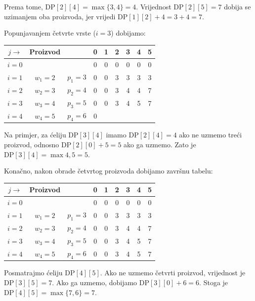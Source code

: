 Prema tome, $\textrm{DP}[2][4]=\max\{3,4\}=4.$ Vrijednost $\textrm{DP}[2][5]=7$ dobija se uzimanjem oba proizvoda, jer vrijedi $\textrm{DP}[1][2]+4 = 3+4 = 7.$

\medskip

Popunjavanjem četvrte vrste ($i=3$) dobijamo:

\begin{table}[H]
	\centering
	\begin{tabular}{|c|cc|cccccc|}\hline
		$j\rightarrow$ & Proizvod & & 0 & 1 & 2 & 3 & 4 & 5 \\ \hline
		$i=0$ & & & 0 & 0 & 0 & 0 & 0 & 0 \\
		$i=1$ & $w_1=2$ & $p_1=3$ & 0 & 0 & 3 & 3 & 3 & 3 \\
		$i=2$ & $w_2=3$ & $p_2=4$ & 0 & 0 & 3 & 4 & 4 & 7 \\
		$i=3$ & $w_3=4$ & $p_3=5$ & 0 & 0 & 3 & 4 & 5 & 7 \\
		$i=4$ & $w_4=5$ & $p_4=6$ & 0 & & & & & \\ \hline
	\end{tabular}
\end{table}

Na primjer, za ćeliju $\textrm{DP}[3][4]$ imamo $\textrm{DP}[2][4]=4$ ako ne uzmemo treći proizvod, odnosno $\textrm{DP}[2][0]+5=5$ ako ga uzmemo. Zato je $\textrm{DP}[3][4]=\max{4,5}=5.$

\medskip

Konačno, nakon obrade četvrtog proizvoda dobijamo završnu tabelu:

\begin{table}[H]
	\centering
	\begin{tabular}{|c|cc|cccccc|}\hline
		$j\rightarrow$ & Proizvod & & 0 & 1 & 2 & 3 & 4 & 5 \\ \hline
		$i=0$ & & & 0 & 0 & 0 & 0 & 0 & 0 \\
		$i=1$ & $w_1=2$ & $p_1=3$ & 0 & 0 & 3 & 3 & 3 & 3 \\
		$i=2$ & $w_2=3$ & $p_2=4$ & 0 & 0 & 3 & 4 & 4 & 7 \\
		$i=3$ & $w_3=4$ & $p_3=5$ & 0 & 0 & 3 & 4 & 5 & 7 \\
		$i=4$ & $w_4=5$ & $p_4=6$ & 0 & 0 & 3 & 4 & 5 & 7 \\ \hline
	\end{tabular}
\end{table}

Posmatrajmo ćeliju $\textrm{DP}[4][5]$. Ako ne uzmemo četvrti proizvod, vrijednost je $ \textrm{DP}[3][5]=7.$ Ako ga uzmemo, dobijamo $\textrm{DP}[3][0]+6=6.$ Stoga je $ \textrm{DP}[4][5]=\max\{7,6\}=7.$

